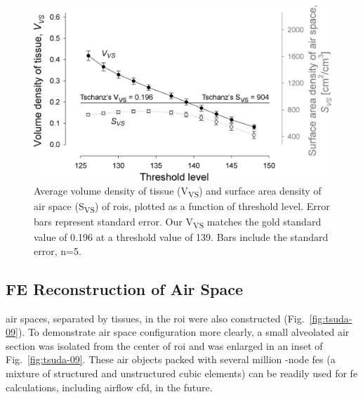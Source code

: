 \renewcommand{\imsize}{\linewidth}
\begin{figure}[h]
	\centering
	\includegraphics[width=\imsize]{img/Tsuda2008/Tsuda-08}
	\caption[Average volume density of tissue and surface area density of air space]{Average volume density of tissue (V\textsubscript{VS}) and surface area density of air space (S\textsubscript{VS}) of \acp{roi}, plotted as a function of threshold level. Error bars represent standard error. Our V\textsubscript{VS} matches the gold standard value of 0.196 at a threshold value of 139. Bars include the standard error, n=5.}
	\label{fig:VVSplot}
\end{figure}

\subsection{FE \threed Reconstruction of Air Space}
\threed air spaces, separated by tissues, in the \ac{roi} were also constructed (Fig.~\ref{fig:tsuda-09}). To demonstrate air space configuration more clearly, a small alveolated air section was isolated from the center of \ac{roi} and was enlarged in an inset of Fig.~\ref{fig:tsuda-09}. These \threed air objects packed with several million -node \acp{fe} (a mixture of structured and unstructured cubic elements) can be readily used for \ac{fe} calculations, including airflow \ac{cfd}, in the future.


